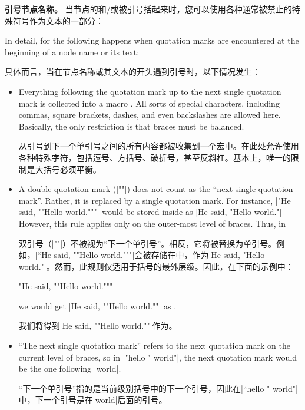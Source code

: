 \textbf{引号节点名称。} 当节点的和/或被引号括起来时，您可以使用各种通常被禁止的特殊符号作为文本的一部分：

\begin{codeexample}[preamble={\usetikzlibrary{graphs}}]
\end{codeexample}

In detail, for the following happens when quotation marks are encountered at
the beginning of a node name or its text:

具体而言，当在节点名称或其文本的开头遇到引号时，以下情况发生：

\begin{itemize}
    \item Everything following the quotation mark up to the next single
        quotation mark is collected into a macro . All sorts of
        special characters, including commas, square brackets, dashes, and even
        backslashes are allowed here. Basically, the only restriction is that
        braces must be balanced.

        从引号到下一个单引号之间的所有内容都被收集到一个宏中。在此处允许使用各种特殊字符，包括逗号、方括号、破折号，甚至反斜杠。基本上，唯一的限制是大括号必须平衡。

    \item A double quotation mark (|""|) does not count as the ``next single
        quotation mark''. Rather, it is replaced by a single quotation mark.
        For instance, |"He said, ""Hello world."""| would be stored inside
         as |He said, "Hello world."| However, this rule
        applies only on the outer-most level of braces. Thus, in

        双引号（|""|）不被视为“下一个单引号”。相反，它将被替换为单引号。例如，|“He said, ""Hello world."""|会被存储在中，作为|He said, "Hello world."|。然而，此规则仅适用于括号的最外层级。因此，在下面的示例中：

\begin{codeexample}
"He {said, ""Hello world.""}"
\end{codeexample}
        we would get |He {said, ""Hello world.""}| as .

        我们将得到|He {said, ""Hello world.""}|作为。
    \item ``The next single quotation mark'' refers to the next quotation mark
        on the current level of braces, so in |"hello {"} world"|, the next
        quotation mark would be the one following |world|.

        “下一个单引号”指的是当前级别括号中的下一个引号，因此在|“hello {"} world"|中，下一个引号是在|world|后面的引号。
\end{itemize}

